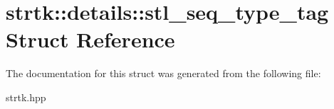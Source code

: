 \hypertarget{structstrtk_1_1details_1_1stl__seq__type__tag}{\section{strtk\-:\-:details\-:\-:stl\-\_\-seq\-\_\-type\-\_\-tag Struct Reference}
\label{structstrtk_1_1details_1_1stl__seq__type__tag}
}


The documentation for this struct was generated from the following file\-:\begin{DoxyCompactItemize}
\item 
strtk.\-hpp\end{DoxyCompactItemize}
